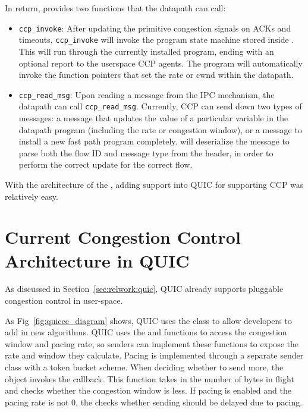 In return,  provides two functions that the datapath can call:
\begin{itemize}
    \item \texttt{ccp\_invoke}: After updating the primitive congestion signals on ACKs and timeouts, \texttt{ccp\_invoke} will invoke the program state machine stored inside \libccp. This will run through the currently installed program, ending with an optional report to the userspace CCP agents. The program will automatically invoke the function pointers that set the rate or cwnd within the datapath.
    \item \texttt{ccp\_read\_msg}: Upon reading a message from the IPC mechanism, the datapath can call \texttt{ccp\_read\_msg}. 
        Currently, CCP can send down two types of messages: a message that updates the value of a particular variable in the datapath program (including the rate or congestion window), or a message to install a new fast path program completely.  will deserialize the message to parse both the flow ID and message type from the header, in order to perform the correct update for the correct flow.
\end{itemize}

With the architecture of the , adding support into QUIC for supporting CCP was relatively easy.

\section{Current Congestion Control Architecture in QUIC}
\label{sec:impl:currentq_quic}
As discussed in Section~\ref{sec:relwork:quic}, QUIC already supports pluggable congestion control in user-space.

As Fig~\ref{fig:quiccc_diagram} shows, QUIC uses the  class to allow developers to add in new algorithms.
QUIC uses the  and  functions to access the congestion window and pacing rate, so senders can implement these functions to expose the rate and window they calculate.
Pacing is implemented through a separate sender class with a token bucket scheme.
When deciding whether to send more, the  object invokes the  callback.
This function takes in the number of bytes in flight and checks whether the congestion window is less.
If pacing is enabled and the pacing rate is not 0, the  checks whether sending should be delayed due to pacing.

